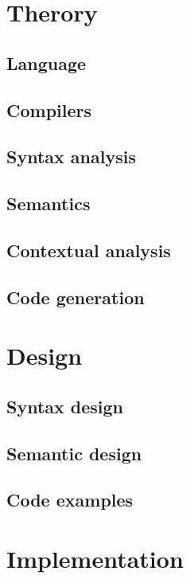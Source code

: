 \renewcommand{\ind}[1]{}
\chapter{Therory}
	\section{Language}
	\ind{sprogParadigmer}
	\section{Compilers}
	
	\section{Syntax analysis}
	\ind{grammartypes}
	\ind{grammar}
	\ind{AboutLexer}
	\section{Semantics}
	\section{Contextual analysis}
	\section{Code generation}

\renewcommand{\ind}[1]{}
\chapter{Design}
	\section{Syntax design}
	\ind{grammarchoice}
	\ind{BNF3}
	\ind{TokenSpecification}
	\section{Semantic design}
	\ind{semantics}
	\ind{TypeRules}
	\section{Code examples}

\renewcommand{\ind}[1]{}
\chapter{Implementation}
	\ind{KnownLexersAndParsers}

